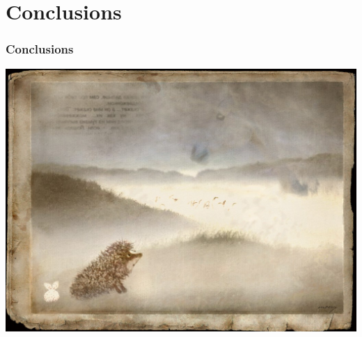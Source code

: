 \documentclass{beamer}
\begin{document}
\section{Conclusions}

\begin{frame}
\frametitle{Conclusions}
\begin{center}
\includegraphics[scale=0.25]{yozhik}
\end{center}
\end{frame}



\end{document}

